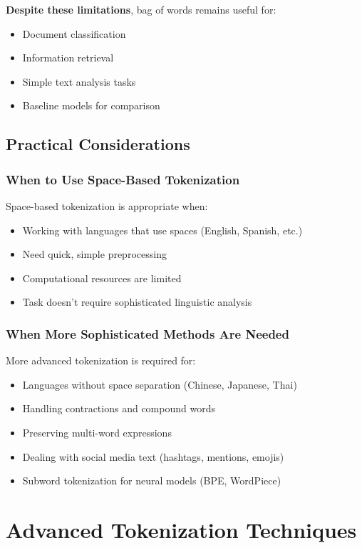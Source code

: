 \documentclass[11pt,a4paper]{article}
\theoremstyle{definition}
\theoremstyle{plain}
\theoremstyle{remark}
\begin{document}
\textbf{Despite these limitations}, bag of words remains useful for:
\begin{itemize}
    \item Document classification
    \item Information retrieval
    \item Simple text analysis tasks
    \item Baseline models for comparison
\end{itemize}

\subsection{Practical Considerations}

\subsubsection{When to Use Space-Based Tokenization}

Space-based tokenization is appropriate when:
\begin{itemize}
    \item Working with languages that use spaces (English, Spanish, etc.)
    \item Need quick, simple preprocessing
    \item Computational resources are limited
    \item Task doesn't require sophisticated linguistic analysis
\end{itemize}

\subsubsection{When More Sophisticated Methods Are Needed}

More advanced tokenization is required for:
\begin{itemize}
    \item Languages without space separation (Chinese, Japanese, Thai)
    \item Handling contractions and compound words
    \item Preserving multi-word expressions
    \item Dealing with social media text (hashtags, mentions, emojis)
    \item Subword tokenization for neural models (BPE, WordPiece)
\end{itemize}

\section{Advanced Tokenization Techniques}
\end{document}
